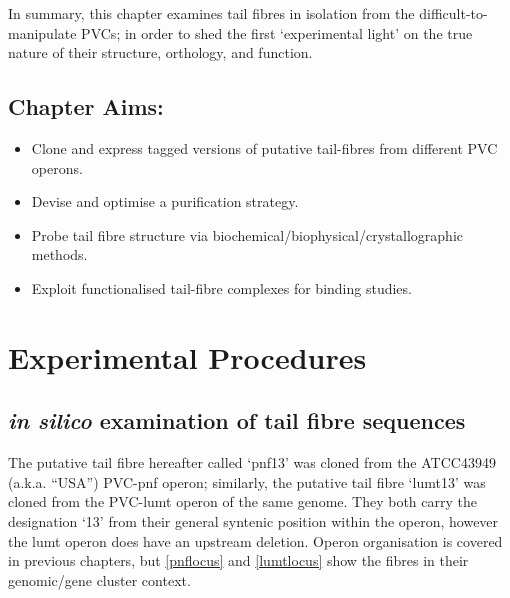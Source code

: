 In summary, this chapter examines tail fibres in isolation from the difficult-to-manipulate PVCs; in order to shed the first `experimental light' on the true nature of their structure, orthology, and function.

\subsection*{Chapter Aims:}
\begin{itemize}
	\item Clone and express tagged versions of putative tail-fibres from different PVC operons.
	\item Devise and optimise a purification strategy.
	\item Probe tail fibre structure via biochemical/biophysical/crystallographic methods.
	\item Exploit functionalised tail-fibre complexes for binding studies.
\end{itemize}
\clearpage

\section{Experimental Procedures}

\subsection{\emph{in silico} examination of tail fibre sequences}
The putative tail fibre hereafter called `pnf13' was cloned from the \Pasy{} ATCC43949 (a.k.a. ``USA'') PVC-pnf operon; similarly, the putative tail fibre `lumt13' was cloned from the PVC-lumt operon of the same genome. They both carry the designation `13' from their general syntenic position within the operon, however the lumt operon does have an upstream deletion. Operon organisation is covered in previous chapters, but \vref{pnflocus} and \vref{lumtlocus} show the fibres in their genomic/gene cluster context.

